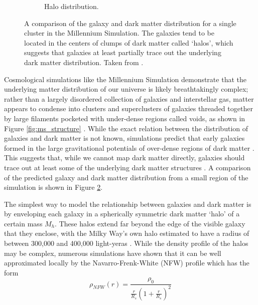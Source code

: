 \documentclass[%
 reprint,
 amsmath,amssymb,
 aps,nofootinbib
]{revtex4-1}
\begin{document}
\begin{figure}
\begin{subfigure}[H]{0.375\textwidth}
        \caption{Halo distribution.}
        \label{ms_halos}
    \end{subfigure}
    \captionsetup{justification=raggedright,singlelinecheck=false}
    \caption{A comparison of the galaxy and dark matter distribution for a single cluster in the Millennium Simulation. The galaxies tend to be located in the centers of clumps of dark matter called `halos', which suggests that galaxies at least partially trace out the underlying dark matter distribution. Taken from \cite{ms_figures}.}
    \label{ms_compare}
\end{figure}


Cosmological simulations like the Millennium Simulation demonstrate that the underlying matter distribution of our universe is likely breathtakingly complex; rather than a largely disordered collection of galaxies and interstellar gas, matter appears to condense into clusters and superclusters of galaxies threaded together by large filaments pocketed with under-dense regions called voids, as shown in Figure \ref{fig:ms_structure} \cite{ms_figures}. While the exact relation between the distribution of galaxies and dark matter is not known, simulations predict that early galaxies formed in the large gravitational potentials of over-dense regions of dark matter \cite{halo_formation}. This suggests that, while we cannot map dark matter directly, galaxies should trace out at least some of the underlying dark matter structures \cite{abundance_matching}. A comparison of the predicted galaxy and dark matter distribution from a small region of the simulation is shown in Figure \ref{ms_compare}.

The simplest way to model the relationship between galaxies and dark matter is by enveloping each galaxy in a spherically symmetric dark matter `halo' of a certain mass $M_h$. These halos extend far beyond the edge of the visible galaxy that they enclose, with the Milky Way's own halo estimated to have a radius of between 300,000 and 400,000 light-yeras \cite{milky_way_halo}. While the density profile of the halos may be complex, numerous simulations have shown that it can be well approximated locally by the Navarro-Frenk-White (NFW) profile which has the form
\begin{equation}\label{nfw_profile}
\rho_{NFW}(r)=\frac{\rho_0}{\frac{r}{R_s}\left(1+\frac{r}{R_s}\right)^2}
\end{equation}
\end{document}
